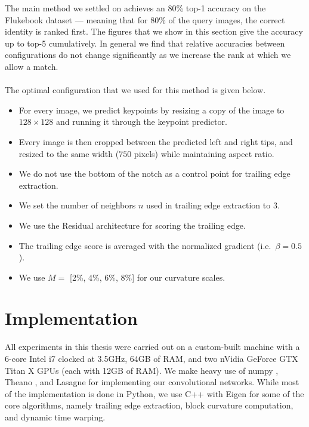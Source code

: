 The main method we settled on achieves an 80\% top-1 accuracy on the Flukebook dataset --- meaning that for 80\% of the query images, the correct identity is ranked first. 
The figures that we show in this section give the accuracy up to top-5 cumulatively.
In general we find that relative accuracies between configurations do not change significantly as we increase the rank at which we allow a match.
\\\\
The optimal configuration that we used for this method is given below.
\begin{itemize}
\item For every image, we predict keypoints by resizing a copy of the image to $128 \times 128$ and running it through the keypoint predictor.
\item Every image is then cropped between the predicted left and right tips, and resized to the same width ($750$ pixels) while maintaining aspect ratio. 
\item We do not use the bottom of the notch as a control point for trailing edge extraction.
\item We set the number of neighbors $n$ used in trailing edge extraction to $3$.
\item We use the Residual architecture for scoring the trailing edge.
\item The trailing edge score is averaged with the normalized gradient (i.e.\ $\beta = 0.5$).
\item We use $M =$ [2\%, 4\%, 6\%, 8\%] for our curvature scales.
\end{itemize}


\section{Implementation}

All experiments in this thesis were carried out on a custom-built machine with a 6-core Intel i7 clocked at 3.5GHz, 64GB of RAM, and two nVidia GeForce GTX Titan X GPUs (each with 12GB of RAM). 
We make heavy use of numpy \cite{van2011numpy}, Theano \cite{bergstra+al:2010-scipy, Bastien-Theano-2012}, and Lasagne \cite{sander_dieleman_2015_27878} for implementing our convolutional networks.
While most of the implementation is done in Python, we use C++ with Eigen \cite{eigenweb} for some of the core algorithms, namely trailing edge extraction, block curvature computation, and dynamic time warping.  


